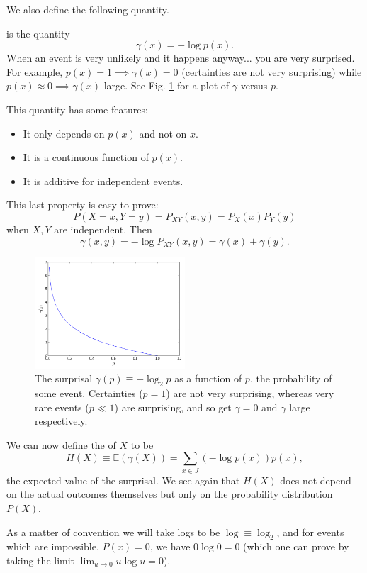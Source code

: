 We also define the following quantity.
\begin{defn}
 is the quantity
\begin{equation}
    \gamma(x)=-\log p(x).
\end{equation}
When an event is very unlikely and it happens anyway... you are very surprised. For example, $p(x)=1\implies \gamma(x)=0$ (certainties are not very surprising) while $p(x)\approx 0 \implies \gamma(x)$ large. See Fig. \ref{fig:surprisal} for a plot of $\gamma$ versus $p$.
\end{defn}
This quantity has some features:
\begin{itemize}
    \item It only depends on $p(x)$ and not on $x$.
    \item It is a continuous function of $p(x).$
    \item It is additive for independent events.
\end{itemize}
This last property is easy to prove:
\begin{equation*}
    P(X=x,Y=y)=P_{XY}(x,y)=P_X(x)P_Y(y)
\end{equation*}
when $X,Y$ are independent. Then
\begin{equation*}
    \gamma(x,y)=-\log P_{XY}(x,y)=\gamma(x)+\gamma(y).
\end{equation*}

\begin{figure}
    \centering
    \includegraphics[width=0.5\textwidth]{2019/01/20190118_surprisal.png}
    \caption{The surprisal $\gamma(p)\equiv -\log_2 p$ as a function of $p$, the probability of some event. Certainties ($p=1$) are not very surprising, whereas very rare events ($p\ll 1$) are surprising, and so get $\gamma=0$ and $\gamma$ large respectively.}
    \label{fig:surprisal}
\end{figure}

\begin{defn}
    We can now define the  of $X$ to be
    \begin{equation}
        H(X)\equiv \mathbb{E}(\gamma(X))=\sum_{x\in J}(-\log p(x))p(x),
    \end{equation}
    the expected value of the surprisal. We see again that $H(X)$ does not depend on the actual outcomes themselves but only on the probability distribution $P(X)$.
\end{defn}
As a matter of convention we will take logs to be $\log{} \equiv \log_2{}$, and for events which are impossible, $P(x)=0$, we have $0\log 0 = 0$ (which one can prove by taking the limit $\lim_{u\to 0}u\log u =0$).

